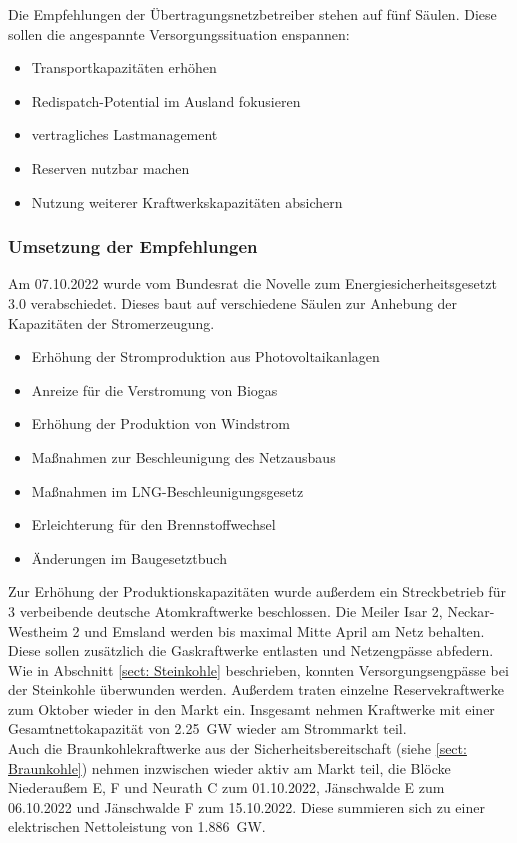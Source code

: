 		Die Empfehlungen der Übertragungsnetzbetreiber stehen auf fünf Säulen. Diese sollen die angespannte Versorgungssituation enspannen:
			\begin{itemize}
				\item Transportkapazitäten erhöhen
				\item Redispatch-Potential im Ausland fokusieren
				\item vertragliches Lastmanagement
				\item Reserven nutzbar machen
				\item Nutzung weiterer Kraftwerkskapazitäten absichern
			\end{itemize}
		
		\subsubsection{Umsetzung der Empfehlungen} \label{sect: Atomausstieg}
		Am 07.10.2022 wurde vom Bundesrat die Novelle zum Energiesicherheitsgesetzt 3.0 verabschiedet. Dieses baut auf verschiedene Säulen zur Anhebung der Kapazitäten der Stromerzeugung. \cite{EnSiG}
			\begin{itemize}
				\item Erhöhung der Stromproduktion aus Photovoltaikanlagen
				\item Anreize für die Verstromung von Biogas
				\item Erhöhung der Produktion von Windstrom
				\item Maßnahmen zur Beschleunigung des Netzausbaus
				\item Maßnahmen im LNG-Beschleunigungsgesetz
				\item Erleichterung für den Brennstoffwechsel
				\item Änderungen im Baugesetztbuch
			\end{itemize}
		
		Zur Erhöhung der Produktionskapazitäten wurde außerdem ein Streckbetrieb für 3 verbeibende deutsche Atomkraftwerke beschlossen. Die Meiler Isar 2, Neckar-Westheim 2 und Emsland werden bis maximal Mitte April am Netz behalten. Diese sollen zusätzlich die Gaskraftwerke entlasten und Netzengpässe abfedern.\cite{Laufzeitverlängerung}\\
		Wie in Abschnitt \ref{sect: Steinkohle} beschrieben, konnten Versorgungsengpässe bei der Steinkohle überwunden werden. Außerdem traten einzelne Reservekraftwerke zum Oktober wieder in den Markt ein. Insgesamt nehmen Kraftwerke mit einer Gesamtnettokapazität von \SI{2,25}{\giga \watt} wieder am Strommarkt teil.\\
		Auch die Braunkohlekraftwerke aus der Sicherheitsbereitschaft (siehe \ref{sect: Braunkohle}) nehmen inzwischen wieder aktiv am Markt teil, die Blöcke Niederaußem E, F und Neurath C zum 01.10.2022, Jänschwalde E zum 06.10.2022 und Jänschwalde F zum 15.10.2022. Diese summieren sich zu einer elektrischen Nettoleistung von \SI{1,886}{\giga \watt}.\cite{Wiedereintritt_Kraftwerke} \\
		
